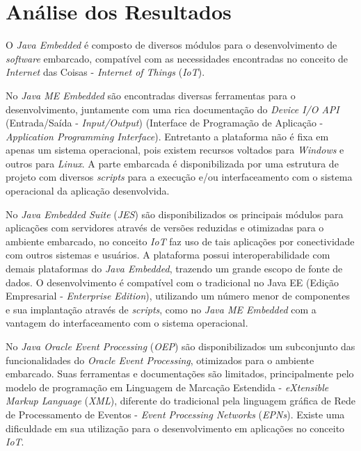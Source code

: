 %

\chapter{Análise dos Resultados}

O \textit{Java Embedded} é composto de diversos módulos para o desenvolvimento
de \textit{software} embarcado, compatível com as necessidades encontradas no
conceito de \textit{Internet} das Coisas - \textit{Internet of Things}
(\textit{IoT}).

No \textit{Java ME Embedded} são encontradas diversas ferramentas para o
desenvolvimento, juntamente com uma rica documentação do \textit{Device I/O
  API} (Entrada/Saída - \textit{Input/Output}) (Interface de Programação de
Aplicação - \textit{Application Programming Interface}). Entretanto a
plataforma não é fixa em apenas um sistema operacional, pois existem recursos
voltados para \textit{Windows} e outros para \textit{Linux}. A parte embarcada
é disponibilizada por uma estrutura de projeto com diversos \textit{scripts}
para a execução e/ou interfaceamento com o sistema operacional da aplicação
desenvolvida.

No \textit{Java Embedded Suite} (\textit{JES}) são disponibilizados os
principais módulos para aplicações com servidores através de versões reduzidas
e otimizadas para o ambiente embarcado, no conceito \textit{IoT} faz uso de
tais aplicações por conectividade com outros sistemas e usuários. A plataforma
possui interoperabilidade com demais plataformas do \textit{Java Embedded},
trazendo um grande escopo de fonte de dados. O desenvolvimento é compatível com
o tradicional no Java EE (Edição Empresarial - \textit{Enterprise Edition}),
utilizando um número menor de componentes e sua implantação através de
\textit{scripts}, como no \textit{Java ME Embedded} com a vantagem do
interfaceamento com o sistema operacional.

No \textit{Java Oracle Event Processing} (\textit{OEP}) são disponibilizados um
subconjunto das funcionalidades do \textit{Oracle Event Processing}, otimizados
para o ambiente embarcado. Suas ferramentas e documentações são limitados,
principalmente pelo modelo de programação em Linguagem de Marcação Estendida -
\textit{eXtensible Markup Language} (\textit{XML}), diferente do tradicional
pela linguagem gráfica de Rede de Processamento de Eventos - \textit{Event
    Processing Networks} (\textit{EPNs}). Existe uma dificuldade em sua
utilização para o desenvolvimento em aplicações no conceito \textit{IoT}.
